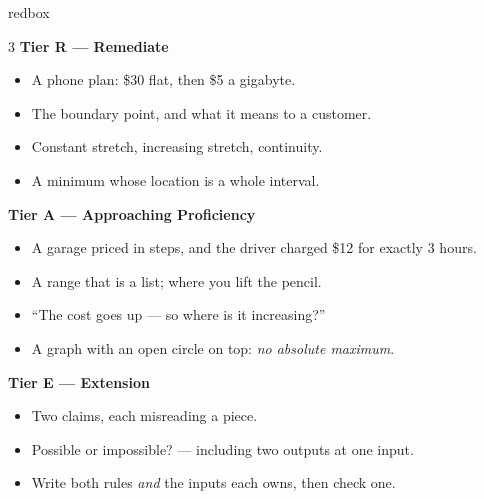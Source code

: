 \documentclass[10pt]{article}
\begin{document}
\boxguard
\begin{skillbox}{redbox}
\begin{multicols}{3}
\textbf{Tier R --- Remediate}
\begin{itemize}[leftmargin=1em, itemsep=1pt, topsep=2pt]
  \item A phone plan: \$30 flat, then \$5 a gigabyte.
  \item The boundary point, and what it means to a customer.
  \item Constant stretch, increasing stretch, continuity.
  \item A minimum whose location is a whole interval.
\end{itemize}

\columnbreak
\textbf{Tier A --- Approaching Proficiency}
\begin{itemize}[leftmargin=1em, itemsep=1pt, topsep=2pt]
  \item A garage priced in steps, and the driver charged \$12 for exactly $3$ hours.
  \item A range that is a list; where you lift the pencil.
  \item ``The cost goes up --- so where is it increasing?''
  \item A graph with an open circle on top: \emph{no absolute maximum}.
\end{itemize}

\columnbreak
\textbf{Tier E --- Extension}
\begin{itemize}[leftmargin=1em, itemsep=1pt, topsep=2pt]
  \item Two claims, each misreading a piece.
  \item Possible or impossible? --- including two outputs at one input.
  \item Write both rules \emph{and} the inputs each owns, then check one.
\end{itemize}
\end{multicols}
\end{skillbox}
\end{document}
